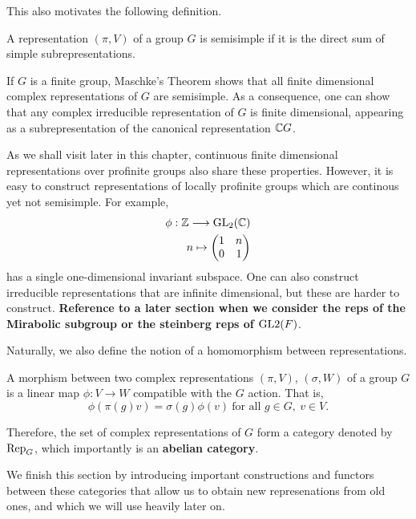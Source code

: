 This also motivates the following definition.

\begin{defn}
    A representation $(\pi,V)$ of a group $G$ is semisimple if it is the direct sum of simple subrepresentations. 
\end{defn}

\begin{rem}\label{rem_semisimple}
    If $G$ is a finite group, Maschke's Theorem shows that all finite dimensional complex representations of $G$ are semisimple. As a consequence, one can show that any complex irreducible representation of $G$ is finite dimensional, appearing as a subrepresentation of the canonical representation $\mathbb{C} G$. 
    
    As we shall visit later in this chapter, continuous finite dimensional representations over profinite groups also share these properties. However, it is easy to construct representations of locally profinite groups which are continous yet not semisimple. For example,
    \begin{align*}
        \phi:\mathbb{Z}\longrightarrow \mathrm{GL}_2(\mathbb{C})\\
        n\mapsto 
        \begin{pmatrix}
            1 & n\\
            0 & 1\\
        \end{pmatrix}
    \end{align*}
    has a single one-dimensional invariant subspace. One can also construct irreducible representations that are infinite dimensional, but these are harder to construct. \textbf{Reference to a later section when we consider the reps of the Mirabolic subgroup or the steinberg reps of $\mathrm{GL}2(F)$}.
\end{rem}


Naturally, we also define the notion of a homomorphism between representations.

\begin{defn}
    A morphism between two complex representations $(\pi,V)$, $(\sigma,W)$ of a group $G$ is a linear map $\phi:V\rightarrow W$ compatible with the $G$ action. That is, 
    $$\phi(\pi(g)v)=\sigma(g)\phi(v)\ \text{for all } g\in G,\ v\in V.$$
\end{defn}

Therefore, the set of complex representations of $G$ form a category denoted by $\mathrm{Rep}_G$, which importantly is an \textbf{abelian category}.

We finish this section by introducing important constructions and functors between these categories that allow us to obtain new represenations from old ones, and which we will use heavily later on.

